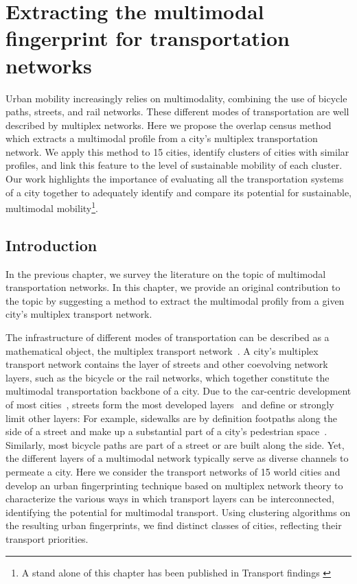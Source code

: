\chapter{Extracting the multimodal fingerprint for transportation networks}\label{ch:OverlapCensus}

Urban mobility increasingly relies on multimodality, combining the use of bicycle paths, streets, and rail networks. These different modes of transportation are well described by multiplex networks. Here we propose the overlap census method which extracts a multimodal profile from a city's multiplex transportation network. We apply this method to 15 cities, identify clusters of cities with similar profiles, and link this feature to the level of sustainable mobility of each cluster. Our work highlights the importance of evaluating all the transportation systems of a city together to adequately identify and compare its potential for sustainable, multimodal mobility\footnote{A stand alone of this chapter has been published in Transport findings \cite{natera2020multimodal}}.
\pagebreak

\section{Introduction}
In the previous chapter, we survey the literature on the topic of multimodal transportation networks. In this chapter, we provide an original contribution to the topic by suggesting a method to extract the multimodal profily from a given city's multiplex transport network.

The infrastructure of different modes of transportation can be described as a mathematical object, the multiplex transport network~\cite{morris2012transport,strano2012evolution,Barthelemy2013Evolution,battiston2014structural,Gallotti2014Efficiency,dedomenico2014interconnected,strano2015features,Aleta2017Multilayer,Lee2017Morphology}. A city's multiplex transport network contains the layer of streets and other coevolving network layers, such as the bicycle or the rail networks, which together constitute the multimodal transportation backbone of a city. Due to the car-centric development of most cities~\cite{Jacobs1961Death}, streets form the most developed layers~\cite{Gossling2016Space,Szell2018Crowdsourced} and define or strongly limit other layers: For example, sidewalks are by definition footpaths along the side of a street and make up a substantial part of a city's pedestrian space~\cite{Gossling2016Space}. Similarly, most bicycle paths are part of a street or are built along the side. Yet, the different layers of a multimodal network typically serve as diverse channels to permeate a city. Here we consider the transport networks of 15 world cities and develop an urban fingerprinting technique based on multiplex network theory to characterize the various ways in which transport layers can be interconnected, identifying the potential for multimodal transport. Using clustering algorithms on the resulting urban fingerprints, we find distinct classes of cities, reflecting their transport priorities.


